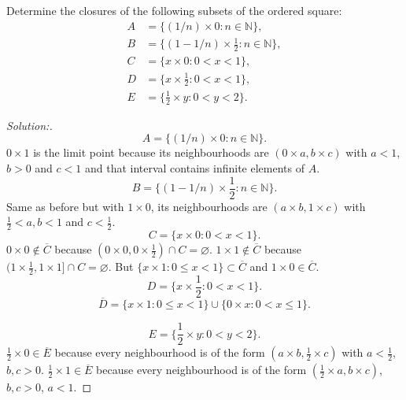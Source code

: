 \documentclass[a4paper,12pt, reqno]{article}
\theoremstyle{definition}
\newenvironment{exerr}[1]{
  \renewcommand\theexeralt{#1}
  \exeralt
}{\endexeralt}
\newenvironment{solution}{\begin{proof}[Solution:]}{\end{proof}}
\newcommand{\N}{\mathbb{N}}
\begin{document}
\begin{exerr}{18}
  Determine the closures of the following subsets of the ordered square:
  \begin{align*}
    A & = \{ (1/n)\times 0 : n\in\N \},             \\
    B & = \{ (1-1/n)\times \frac{1}{2} : n\in\N \}, \\
    C & = \{ x\times0 : 0<x<1 \},                   \\
    D & = \{ x\times \frac{1}{2} : 0<x<1 \},        \\
    E & = \{ \frac{1}{2}\times y : 0<y<2 \}.
  \end{align*}
\end{exerr}
\begin{solution}
  \begin{equation*}
    A =  \{ (1/n)\times 0 : n\in\N \}.
  \end{equation*}
  $0\times 1$ is the limit point because its neighbourhoods are $(0\times a,b\times c)$ with $a<1$, $b>0$ and $c<1$ and that interval contains infinite elements of $A$.
  \begin{equation*}
    B = \{ (1-1/n)\times \frac{1}{2} : n\in\N \}.
  \end{equation*}
  Same as before but with $1\times 0$, its neighbourhoods are $(a\times b,1\times c)$ with $\frac{1}{2}<a,b<1$ and $c<\frac{1}{2}$.
  \begin{equation*}
    C = \{ x\times0 : 0<x<1 \}.
  \end{equation*}
  $0\times0\notin \overline{C}$ because $(0\times0,0\times \frac{1}{2})\cap C = \varnothing$. $1\times 1\notin \overline{C}$ because $(1\times \frac{1}{2},1\times 1]\cap C = \varnothing$.
  But $\{ x\times 1 : 0\leq x<1 \}\subset \overline{C}$ and $1\times 0\in \overline{C}$.
  \begin{equation*}
    D = \{ x\times \frac{1}{2} : 0<x<1 \}.
  \end{equation*}
  \begin{equation*}
    \overline{D} = \{ x\times 1 : 0\leq x<1 \}\cup\{ 0\times x : 0<x\leq 1 \}.
  \end{equation*}

  \begin{equation*}
    E = \{ \frac{1}{2}\times y : 0<y<2 \}.
  \end{equation*}
  $\frac{1}{2}\times 0\in \overline{E}$ because every neighbourhood is of the form $(a\times b, \frac{1}{2}\times c)$ with $a<\frac{1}{2}$, $b,c>0$. $\frac{1}{2}\times 1\in \overline{E}$ because every neighbourhood is of the form $(\frac{1}{2}\times a, b\times c)$, $b,c>0$, $a<1$.
\end{solution}
\end{document}
